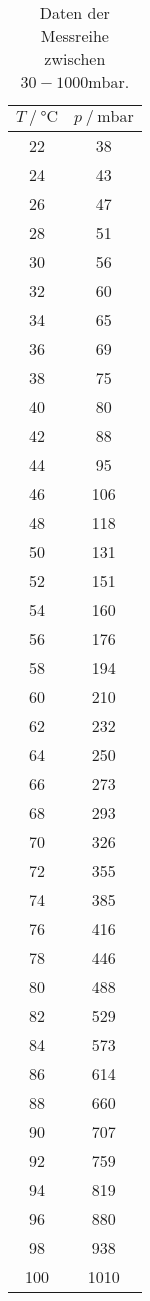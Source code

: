 \begin{table}
  \centering
  \caption{Daten der Messreihe zwischen $30-1000\unit{\milli\bar}$.}
  \begin{tabular}{cc}
    \toprule
    {$T \mathbin{/} \unit{\celsius}$} &
    {$p \mathbin{/} \unit{\milli\bar}$} \\
    \midrule
      22 &  38 \\
      24 &  43 \\
      26 &  47 \\
      28 &  51 \\
      30 &  56 \\
      32 &  60 \\
      34 &  65 \\
      36 &  69 \\
      38 &  75 \\
      40 &  80 \\
      42 &  88 \\
      44 &  95 \\
      46 & 106 \\
      48 & 118 \\
      50 & 131 \\
      52 & 151 \\
      54 & 160 \\
      56 & 176 \\
      58 & 194 \\
      60 & 210 \\
      62 & 232 \\
      64 & 250 \\
      66 & 273 \\
      68 & 293 \\
      70 & 326 \\
      72 & 355 \\
      74 & 385 \\
      76 & 416 \\
      78 & 446 \\
      80 & 488 \\
      82 & 529 \\
      84 & 573 \\
      86 & 614 \\
      88 & 660 \\
      90 & 707 \\
      92 & 759 \\
      94 & 819 \\
      96 & 880 \\
      98 & 938 \\
      100 & 1010 \\
    \bottomrule
  \end{tabular}
  \label{tab:Tabelle1}
\end{table}
